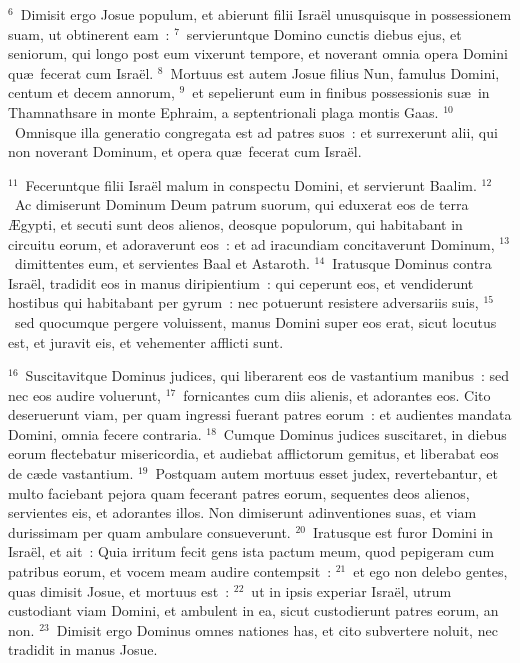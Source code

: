 ${}^{6}$~Dimisit ergo Josue populum, et abierunt filii Isra\"el unusquisque in possessionem suam, ut obtinerent eam~:
${}^{7}$~servieruntque Domino cunctis diebus ejus, et seniorum, qui longo post eum vixerunt tempore, et noverant omnia opera Domini qu\ae\ fecerat cum Isra\"el.
${}^{8}$~Mortuus est autem Josue filius Nun, famulus Domini, centum et decem annorum,
${}^{9}$~et sepelierunt eum in finibus possessionis su\ae\ in Thamnathsare in monte Ephraim, a septentrionali plaga montis Gaas.
${}^{10}$~Omnisque illa generatio congregata est ad patres suos~: et surrexerunt alii, qui non noverant Dominum, et opera qu\ae\ fecerat cum Isra\"el.


${}^{11}$~Feceruntque filii Isra\"el malum in conspectu Domini, et servierunt Baalim.
${}^{12}$~Ac dimiserunt Dominum Deum patrum suorum, qui eduxerat eos de terra \AE gypti, et secuti sunt deos alienos, deosque populorum, qui habitabant in circuitu eorum, et adoraverunt eos~: et ad iracundiam concitaverunt Dominum,
${}^{13}$~dimittentes eum, et servientes Baal et Astaroth.
${}^{14}$~Iratusque Dominus contra Isra\"el, tradidit eos in manus diripientium~: qui ceperunt eos, et vendiderunt hostibus qui habitabant per gyrum~: nec potuerunt resistere adversariis suis,
${}^{15}$~sed quocumque pergere voluissent, manus Domini super eos erat, sicut locutus est, et juravit eis, et vehementer afflicti sunt.


${}^{16}$~Suscitavitque Dominus judices, qui liberarent eos de vastantium manibus~: sed nec eos audire voluerunt,
${}^{17}$~fornicantes cum diis alienis, et adorantes eos. Cito deseruerunt viam, per quam ingressi fuerant patres eorum~: et audientes mandata Domini, omnia fecere contraria.
${}^{18}$~Cumque Dominus judices suscitaret, in diebus eorum flectebatur misericordia, et audiebat afflictorum gemitus, et liberabat eos de c\ae de vastantium.
${}^{19}$~Postquam autem mortuus esset judex, revertebantur, et multo faciebant pejora quam fecerant patres eorum, sequentes deos alienos, servientes eis, et adorantes illos. Non dimiserunt adinventiones suas, et viam durissimam per quam ambulare consueverunt.
${}^{20}$~Iratusque est furor Domini in Isra\"el, et ait~: Quia irritum fecit gens ista pactum meum, quod pepigeram cum patribus eorum, et vocem meam audire contempsit~:
${}^{21}$~et ego non delebo gentes, quas dimisit Josue, et mortuus est~:
${}^{22}$~ut in ipsis experiar Isra\"el, utrum custodiant viam Domini, et ambulent in ea, sicut custodierunt patres eorum, an non.
${}^{23}$~Dimisit ergo Dominus omnes nationes has, et cito subvertere noluit, nec tradidit in manus Josue.

